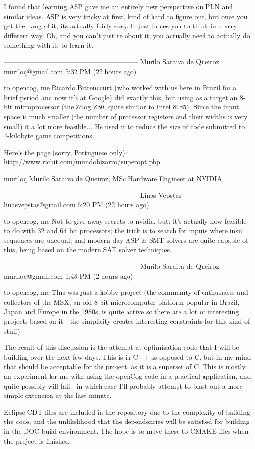 \documentclass[11pt]{article}
\begin{document}
I found that learning ASP gave me an entirely new perspective on PLN and similar ideas.   ASP is very tricky at first, kind of hard to figure out, but once you get the hang of it, its actually fairly easy.  It just forces you to think in a very different way.  Oh, and you can't just re about it; you actually need to actually do something with it, to learn it.

-----------------------------------------------------------
Murilo Saraiva de Queiroz muriloq@gmail.com
5:32 PM (22 hours ago)

to opencog, me 
Ricardo Bittencourt (who worked with us here in Brazil for a brief period and now it's at Google) did exactly this, but using as a target an 8-bit microprocessor (the Zilog Z80, quite similar to Intel 8085). Since the input space is much smaller (the number of processor registers and their widths is very small) it a lot more feasible... He used it to reduce the size of code submitted to 4-kilobyte game competitions. 

Here's the page (sorry, Portuguese only):  http://www.ricbit.com/mundobizarro/superopt.php  

muriloq
Murilo Saraiva de Queiroz, MSc
Hardware Engineer at NVIDIA

-----------------------------------------------------------
Linas Vepstas linasvepstas@gmail.com
6:20 PM (22 hours ago)

to opencog, me 
Not to give away secrets to nvidia, but: it's actually now feasible to do with 32 and 64 bit processors; the trick is to search for inputs where insn sequences are unequal; and modern-day ASP & SMT solvers are quite capable of this, being based on the modern SAT solver techniques.

-----------------------------------------------------------
Murilo Saraiva de Queiroz muriloq@gmail.com
1:48 PM (2 hours ago)

to opencog, me 
This was just a hobby project (the community of enthusiasts and collectors of the MSX, an old 8-bit microcomputer platform popular in Brazil, Japan and Europe in the 1980s, is quite active so there are a lot of interesting projects based on it - the simplicity creates interesting constraints for this kind of stuff)
-----------------------------------------------------------
 
The result of this discussion is the attempt at optimisation code that I will be building over the next few days. This is in C++ as opposed to C, but in my mind that should be acceptable for the project, as it is a superset of C. This is mostly an experiment for me with using the openCog code in a practical application, and quite possibly will fail - in which case I'll probably attempt to blast out a more simple extension at the last minute.

Eclipse CDT files are included in the repository due to the complexity of building the code, and the unlikelihood that the dependencies will be satisfied for building in the DOC build environment. The hope is to move these to CMAKE files when the project is finished.
\end{document}
